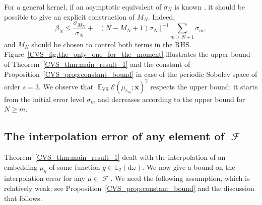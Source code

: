 \documentclass[twoside,11pt]{book}
\newtheorem{theorem}{Theorem}
\numberwithin{theorem}{chapter}
\numberwithin{definition}{chapter}
\numberwithin{proposition}{chapter}
\numberwithin{corollary}{chapter}
\numberwithin{example}{chapter}
\numberwithin{lemma}{chapter}
\numberwithin{assumption}{chapter}
\numberwithin{equation}{chapter}
\numberwithin{figure}{chapter}
\DeclareMathOperator{\VS}{\mathrm{VS}}
\DeclareMathOperator{\EX}{\mathbb{E}}
\DeclareMathOperator{\F}{\mathcal{F}}
\def\Ltwo{\mathbb{L}_{2}(\mathrm{d} \omega)}
\newcommand{\pc}[1]{\textcolor{blue}{#1}}
\begin{document}
 For a general kernel, if an asymptotic equivalent of $\sigma_{N}$ is known \citep{Wid63,Wid64}, it should be possible to give an explicit construction of $M_N$. Indeed,
\begin{equation}
 \beta_{N} \leq \frac{\sigma_{M_{N}}}{\sigma_{N}} + [{(N-M_{N}+1)\sigma_{N}}]^{-1} \sum\limits_{m \geq N+1}\sigma_{m},
\end{equation}
and $M_{N}$ should be chosen to control both terms in the RHS.
%
Figure~\ref{CVS_fig:the_only_one_for_the_moment} illustrates the upper bound of Theorem~\ref{CVS_thm:main_result_1} and the constant of Proposition~\ref{CVS_prop:constant_bound} in case of the periodic Sobolev space of order $s=3$. We observe that $\EX_{\VS} \mathcal{E}(\mu_{e_m};\bm{x})^{2}$ respects the upper bound: it starts from the initial error level $\sigma_m$ and decreases according to the upper bound for $N \geq m$.




\subsection{The interpolation error of any element of $\F$}\label{CVS_sec:main_theorems_2}
%
%
Theorem~\ref{CVS_thm:main_result_1} dealt with the interpolation of an embedding $\mu_{g}$ of some function $g\in\Ltwo$. We now give a bound on the interpolation error for any $\mu\in\F$. We need the following assumption, which is relatively weak; see Proposition~\ref{CVS_prop:constant_bound} and the discussion that follows.
\end{document}
